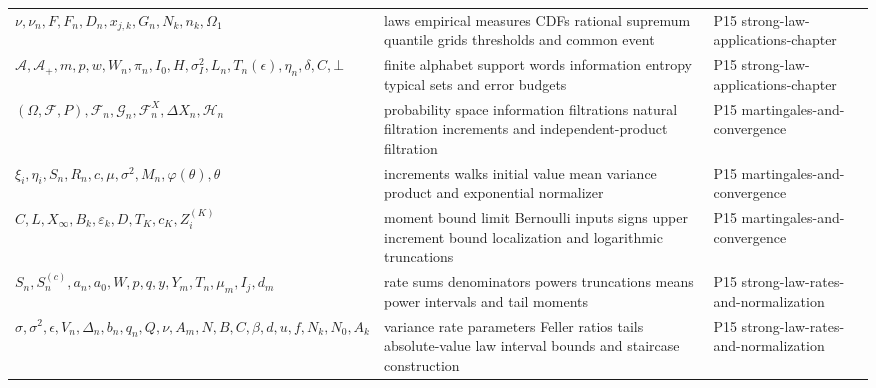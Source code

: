\begin{longtable}{@{}p{}p{}p{}@{}}
\(\nu,\allowbreak \nu_n,\allowbreak F,\allowbreak F_n,\allowbreak D_n,\allowbreak x_{j,k},\allowbreak G_n,\allowbreak N_k,\allowbreak n_k,\allowbreak \Omega_1\) & laws empirical measures CDFs rational supremum quantile grids thresholds and common event & P15 strong-\allowbreak{}law-\allowbreak{}applications-\allowbreak{}chapter \\
\(\mathcal A,\allowbreak \mathcal A_+,\allowbreak m,\allowbreak p,\allowbreak w,\allowbreak W_n,\allowbreak \pi_n,\allowbreak I_0,\allowbreak H,\allowbreak \sigma_I^2,\allowbreak L_n,\allowbreak T_n(\epsilon),\allowbreak \eta_n,\allowbreak \delta,\allowbreak C,\allowbreak \bot\) & finite alphabet support words information entropy typical sets and error budgets & P15 strong-\allowbreak{}law-\allowbreak{}applications-\allowbreak{}chapter \\
\((\Omega,\allowbreak \mathcal F,\allowbreak P),\allowbreak \mathcal F_n,\allowbreak \mathcal G_n,\allowbreak \mathcal F_n^X,\allowbreak \Delta X_n,\allowbreak \mathcal H_n\) & probability space information filtrations natural filtration increments and independent-product filtration & P15 martingales-\allowbreak{}and-\allowbreak{}convergence \\
\(\xi_i,\allowbreak \eta_i,\allowbreak S_n,\allowbreak R_n,\allowbreak c,\allowbreak \mu,\allowbreak \sigma^2,\allowbreak M_n,\allowbreak \varphi(\theta),\allowbreak \theta\) & increments walks initial value mean variance product and exponential normalizer & P15 martingales-\allowbreak{}and-\allowbreak{}convergence \\
\(C,\allowbreak L,\allowbreak X_\infty,\allowbreak B_k,\allowbreak \varepsilon_k,\allowbreak D,\allowbreak T_K,\allowbreak c_K,\allowbreak Z_i^{(K)}\) & moment bound limit Bernoulli inputs signs upper increment bound localization and logarithmic truncations & P15 martingales-\allowbreak{}and-\allowbreak{}convergence \\
\(S_n,\allowbreak S_n^{(c)},\allowbreak a_n,\allowbreak a_0,\allowbreak W,\allowbreak p,\allowbreak q,\allowbreak y,\allowbreak Y_m,\allowbreak T_n,\allowbreak \mu_m,\allowbreak I_j,\allowbreak d_m\) & rate sums denominators powers truncations means power intervals and tail moments & P15 strong-\allowbreak{}law-\allowbreak{}rates-\allowbreak{}and-\allowbreak{}normalization \\
\(\sigma,\allowbreak \sigma^2,\allowbreak \epsilon,\allowbreak V_n,\allowbreak \Delta_n,\allowbreak b_n,\allowbreak q_n,\allowbreak Q,\allowbreak \nu,\allowbreak A_m,\allowbreak N,\allowbreak B,\allowbreak C,\allowbreak \beta,\allowbreak d,\allowbreak u,\allowbreak f,\allowbreak N_k,\allowbreak N_0,\allowbreak A_k\) & variance rate parameters Feller ratios tails absolute-value law interval bounds and staircase construction & P15 strong-\allowbreak{}law-\allowbreak{}rates-\allowbreak{}and-\allowbreak{}normalization \\

\end{longtable}
